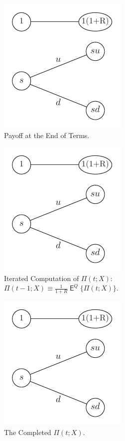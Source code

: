 \documentclass[10pt,handout]{beamer}
\newcommand{\ds}{\displaystyle}
\DeclareMathOperator\expc{\mathsf{E}}
\theoremstyle{definition}
\begin{document}
\begin{frame}
  \begin{figure}[!htbp]
    \centering
    \includegraphics[scale=1,page=5]{fig/note08/bjork.pdf}
    \caption{Payoff at the End of Terms.}
  \end{figure}
\end{frame}

\begin{frame}
  \begin{figure}[!htbp]
    \centering
    \includegraphics[scale=1,page=7]{fig/note08/bjork.pdf}
    \caption{Iterated Computation of $\ds\Pi(t;X):\;$ $\ds\Pi(t-1; X)\equiv\frac{1}{1+R}\expc^Q\{\Pi(t; X)\}$.} %
  \end{figure}
\end{frame}

\begin{frame}
  \begin{figure}[!htbp]
    \centering
    \includegraphics[scale=1,page=9]{fig/note08/bjork.pdf}
    \caption{The Completed $\Pi(t; X)$.} 
  \end{figure}
\end{frame}
\end{document}
